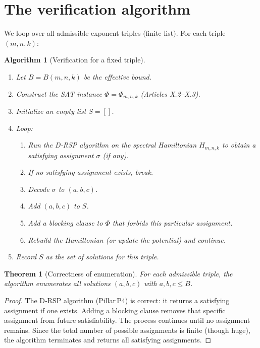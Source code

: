 \documentclass[11pt,a4paper]{article}
\newtheorem{theorem}{Theorem}[section]
\newtheorem{algorithm}{Algorithm}[section]
\begin{document}
\section{The verification algorithm}

We loop over all admissible exponent triples (finite list). For each triple \((m,n,k)\):

\begin{algorithm}[Verification for a fixed triple]\label{alg:fc}
\begin{enumerate}
\item Let \(B = B(m,n,k)\) be the effective bound.
\item Construct the SAT instance \(\Phi = \Phi_{m,n,k}\) (Articles X.2–X.3).
\item Initialize an empty list \(S = []\).
\item Loop:
   \begin{enumerate}
   \item Run the D‑RSP algorithm on the spectral Hamiltonian \(H_{m,n,k}\) to obtain a satisfying assignment \(\sigma\) (if any).
   \item If no satisfying assignment exists, break.
   \item Decode \(\sigma\) to \((a,b,c)\).
   \item Add \((a,b,c)\) to \(S\).
   \item Add a blocking clause to \(\Phi\) that forbids this particular assignment.
   \item Rebuild the Hamiltonian (or update the potential) and continue.
   \end{enumerate}
\item Record \(S\) as the set of solutions for this triple.
\end{enumerate}
\end{algorithm}

\begin{theorem}[Correctness of enumeration]
For each admissible triple, the algorithm enumerates all solutions \((a,b,c)\) with \(a,b,c \le B\).
\end{theorem}
\begin{proof}
The D‑RSP algorithm (Pillar P4) is correct: it returns a satisfying assignment if one exists. Adding a blocking clause removes that specific assignment from future satisfiability. The process continues until no assignment remains. Since the total number of possible assignments is finite (though huge), the algorithm terminates and returns all satisfying assignments.
\end{proof}
\end{document}
